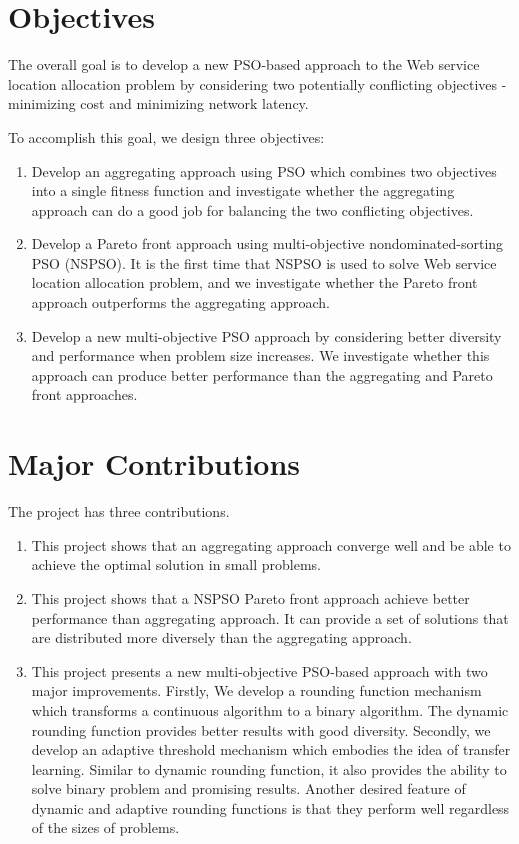 \section{Objectives}
The overall goal is to develop a new PSO-based approach to the Web service location allocation problem by considering two potentially 
conflicting objectives - minimizing cost and minimizing network latency. 

To accomplish this goal, we design three objectives:
\begin{enumerate}
 \item Develop an aggregating approach using PSO which combines two objectives into a single fitness function and investigate whether the aggregating
	approach can do a good job for balancing the two conflicting objectives.
 \item Develop a Pareto front approach using multi-objective nondominated-sorting PSO (NSPSO). It is the first time that NSPSO is 
	used to solve Web service location allocation problem, and we investigate whether the Pareto front approach outperforms the aggregating approach.
 \item Develop a new multi-objective PSO approach by considering better diversity and performance when problem size increases. We investigate whether
	this approach can produce better performance than the aggregating and Pareto front approaches.
\end{enumerate}



\section{Major Contributions}
 The project has three contributions. 
 \begin{enumerate}
 \item This project shows that an aggregating approach converge well and be able to achieve the optimal solution in small problems.
 \item This project shows that a NSPSO Pareto front approach achieve better performance than aggregating approach. It can provide a set of solutions that are distributed more diversely
 than the aggregating approach.
  \item This project presents a new multi-objective PSO-based approach with two major improvements. 
      Firstly, We develop a rounding function mechanism which transforms a continuous algorithm to a binary algorithm. 
      The dynamic rounding function provides better results with good diversity. 
      Secondly, we develop an adaptive threshold mechanism which embodies the idea of transfer learning. 
      Similar to dynamic rounding function, it also provides the ability to solve binary problem and promising results.
      Another desired feature of dynamic and adaptive rounding functions is that they perform well regardless of the sizes of problems.
 \end{enumerate}

